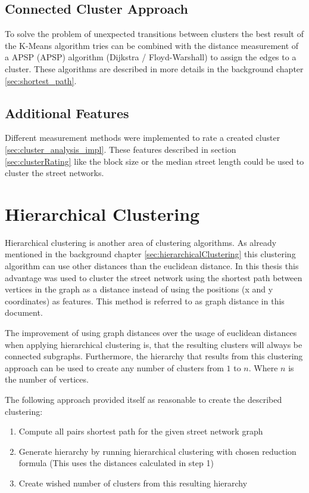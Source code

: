 \subsection{Connected Cluster Approach} \label{sec:connected_cluster_approach}
To solve the problem of unexpected transitions between clusters the best result of the K-Means algorithm tries can be combined with the distance measurement of a \acrlong{APSP} (\acrshort{APSP}) algorithm (Dijkstra / Floyd-Warshall) to assign the edges to a cluster. These algorithms are described in more details in the background chapter \ref{sec:shortest_path}.

\subsection{Additional Features}
Different measurement methods were implemented to rate a created cluster \ref{sec:cluster_analysis_impl}. These features described in section \ref{sec:clusterRating} like the block size or the median street length could be used to cluster the street networks.

\pagebreak
\section{Hierarchical Clustering}
Hierarchical clustering is another area of clustering algorithms. As already mentioned in the background chapter \ref{sec:hierarchicalClustering} this clustering algorithm can use other distances than the euclidean distance. In this thesis this advantage was used to cluster the street network using the shortest path between vertices in the graph as a distance instead of using the positions (x and y coordinates) as features. This method is referred to as graph distance in this document.

The improvement of using graph distances over the usage of euclidean distances when applying hierarchical clustering is, that the resulting clusters will always be connected subgraphs. Furthermore, the hierarchy that results from this clustering approach can be used to create any number of clusters from $1$ to $n$. Where $n$ is the number of vertices.

The following approach provided itself as reasonable to create the described clustering:

\begin{enumerate}
    \item Compute all pairs shortest path for the given street network graph
    \item Generate hierarchy by running hierarchical clustering with chosen reduction formula (This uses the distances calculated in step 1)
    \item Create wished number of clusters from this resulting hierarchy
\end{enumerate}

